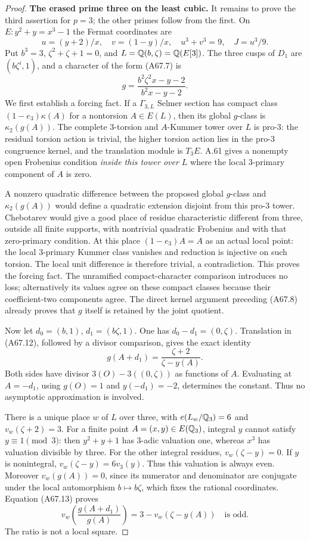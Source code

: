 \begin{proof}
\par\smallskip\noindent\textbf{The erased prime three on the least cubic.}\enspace 
It remains to prove the third
assertion for $p=3$; the other
primes follow from the first.
On $E:y^2+y=x^3-1$ the Fermat
coordinates are
\[
 u=(y+2)/x,\quad v=(1-y)/x,\quad
 u^3+v^3=9,\quad J=u^3/9.
 \tag{A67.11}
\]
Put $b^3=3$, $\zeta^2+\zeta+1=0$,
and $L=\mathbb Q(b,\zeta)=\mathbb Q(E[3])$.
The three cusps of $D_1$ are
$(b\zeta^i,1)$, and a character
of the form (A67.7) is
\[
 g=\frac{b^2\zeta^2x-y-2}{b^2x-y-2}.
 \tag{A67.12}
\]
We first establish a forcing fact.
If a $\Gamma_{3,L}$ Selmer
section has compact class
$(1-e_3)\kappa(A)$ for a
nontorsion $A\in E(L)$, then
its global $g$-class is
$\kappa_2(g(A))$.
The complete $3$-torsion and
$A$-Kummer tower over $L$ is
pro-$3$: the residual torsion
action is trivial, the higher
torsion action lies in the
pro-$3$ congruence kernel,
and the translation module
is $T_3E$. A.61 gives a
nonempty open Frobenius
condition \emph{inside this
tower over $L$} where the
local $3$-primary component
of $A$ is zero.

A nonzero quadratic difference
between the proposed global
$g$-class and $\kappa_2(g(A))$
would define a quadratic
extension disjoint from
this pro-$3$ tower.
Chebotarev would give a good
place of residue characteristic
different from three, outside
all finite supports, with
nontrivial quadratic Frobenius
and with that zero-primary
condition. At this place
$(1-e_3)A=A$ as an actual
local point: the local
$3$-primary Kummer class
vanishes and reduction is
injective on such torsion.
The local unit difference
is therefore trivial, a
contradiction. This proves
the forcing fact.
The unramified compact-character
comparison introduces no loss;
alternatively its values agree
on these compact classes because
their coefficient-two components
agree. The direct kernel
argument preceding (A67.8)
already proves that $g$ itself
is retained by the joint quotient.

Now let $d_0=(b,1)$,
$d_1=(b\zeta,1)$. One has
$d_0-d_1=(0,\zeta)$. Translation
in (A67.12), followed by a
divisor comparison, gives the
exact identity
\[
 g(A+d_1)=\frac{\zeta+2}{\zeta-y(A)}.
 \tag{A67.13}
\]
Both sides have divisor
$3(O)-3((0,\zeta))$ as
functions of $A$. Evaluating
at $A=-d_1$, using $g(O)=1$
and $y(-d_1)=-2$, determines
the constant. Thus no
asymptotic approximation is
involved.

There is a unique place $w$
of $L$ over three, with
$e(L_w/\mathbb Q_3)=6$ and
$v_w(\zeta+2)=3$. For a finite
point $A=(x,y)\in E(\mathbb Q_3)$,
integral $y$ cannot satisfy
$y\equiv1\pmod3$: then
$y^2+y+1$ has $3$-adic
valuation one, whereas
$x^3$ has valuation divisible
by three. For the other
integral residues,
$v_w(\zeta-y)=0$.
If $y$ is nonintegral,
$v_w(\zeta-y)=6v_3(y)$.
Thus this valuation is
always even. Moreover
$v_w(g(A))=0$, since its
numerator and denominator
are conjugate under the
local automorphism
$b\mapsto b\zeta$, which
fixes the rational coordinates.
Equation (A67.13) proves
\[
 v_w\!\left(\frac{g(A+d_1)}{g(A)}\right)
       =3-v_w(\zeta-y(A))\quad
                   \text{is odd}.
 \tag{A67.14}
\]
The ratio is not a local square.


\end{proof}
